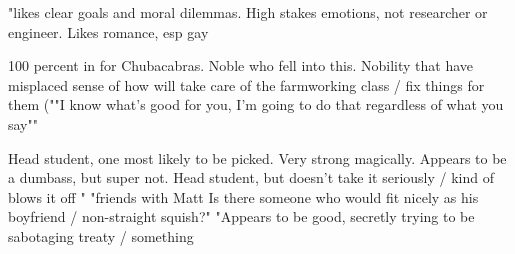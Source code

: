 \documentclass[char]{GL2020}
\begin{document}
\name{\cChupStudent{}}







"likes clear goals and moral dilemmas.  High stakes emotions, not researcher or engineer.  Likes romance, esp gay

100 percent in for Chubacabras.  Noble who fell into this.  Nobility that have misplaced sense of how will take care of the farmworking class / fix things for them (""I know what's good for you, I'm going to do that regardless of what you say""

Head student, one most likely to be picked.  Very strong magically.   Appears to be a dumbass, but super not.  Head student, but doesn't take it seriously / kind of blows it off "	"friends with Matt
Is there someone who would fit nicely as his boyfriend / non-straight squish?"	"Appears to be good, secretly trying to be sabotaging treaty / something
\end{document}
